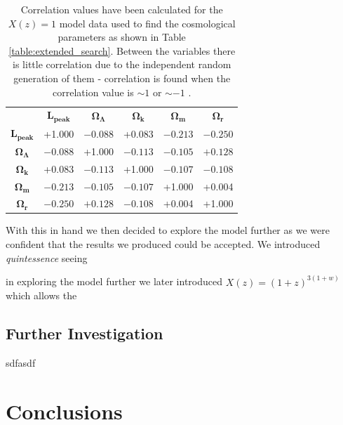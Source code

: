 \documentclass[twocolumn]{revtex4}
\begin{document}
{{{\renewcommand{\arraystretch}{1.2}%
\begin{table}[h!]
\centering
\begin{tabular}{c@{\hskip 10pt}c@{\hskip 10pt}c@{\hskip 10pt}c@{\hskip 10pt}c@{\hskip 10pt}c} 
 \hline
  & \textbf{$\boldsymbol{L_\text{peak}}$} & \textbf{$\boldsymbol{\Omega_\Lambda}$} & \textbf{$\boldsymbol{\Omega_k}$} & \textbf{$\boldsymbol{\Omega_m}$} & \textbf{$\boldsymbol{\Omega_r}$} \\ [0.5ex] 
 \textbf{$\boldsymbol{L_\text{peak}}$} & +1.000 & $-0.088$ & +0.083 & $-0.213$ & $-0.250$ \\
 \textbf{$\boldsymbol{\Omega_\Lambda}$} & $-0.088$ & +1.000 & $-0.113$ & $-0.105$ & $+0.128$ \\
 \textbf{$\boldsymbol{\Omega_k}$} & +0.083 & $-0.113$ & +1.000 & $-0.107$ & $-0.108$ \\
 \textbf{$\boldsymbol{\Omega_m}$} & $-0.213$ & $-0.105$ & $-0.107$ & +1.000 & +0.004 \\
 \textbf{$\boldsymbol{\Omega_r}$} & $-0.250$ & $+0.128$  & $-0.108$ & +0.004 & +1.000\\
 \hline
\end{tabular}
\caption{Correlation values have been calculated for the $X(z)=1$ model data used to find the cosmological parameters as shown in Table \ref{table:extended_search}. Between the variables there is little correlation due to the independent random generation of them - correlation is found when the correlation value is $\sim1$ or $\sim -1$ \cite{hugheshase}.}
\vspace{-0.5em}
\label{table:correlations}
\end{table}

With this in hand we then decided to explore the model further as we were confident that the results we produced could be accepted. We introduced \textit{quintessence} seeing 

in exploring the model further we later introduced $X(z)=(1+z)^{3(1+w)}$ which allows the  

\vspace{-3ex}
\subsection{Further Investigation} 
\vspace{-2ex}

sdfasdf


\vspace{-5ex}
\section{Conclusions}
\vspace{-2ex}

}}}
\end{document}
